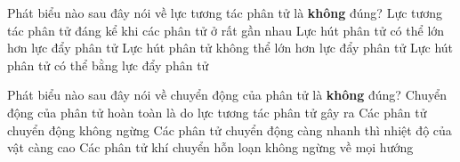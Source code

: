 \begin{ex}%
	Phát biểu nào sau đây nói về lực tương tác phân tử là \textbf{không} đúng?
	\choice
	{Lực tương tác phân tử đáng kể khi các phân tử ở rất gần nhau}
	{Lực hút phân tử có thể lớn hơn lực đẩy phân tử}
	{\True Lực hút phân tử không thể lớn hơn lực đẩy phân tử}
	{Lực hút phân tử có thể bằng lực đẩy phân tử}
	\end{ex}



\begin{ex}%
	Phát biểu nào sau đây nói về chuyển động của phân tử là \textbf{không} đúng?
	\choice
	{\True Chuyển động của phân tử hoàn toàn là do lực tương tác phân tử gây ra}
	{Các phân tử chuyển động không ngừng}
	{Các phân tử chuyển động càng nhanh thì nhiệt độ của vật càng cao}
	{Các phân tử khí chuyển hỗn loạn không ngừng về mọi hướng}
\end{ex}








